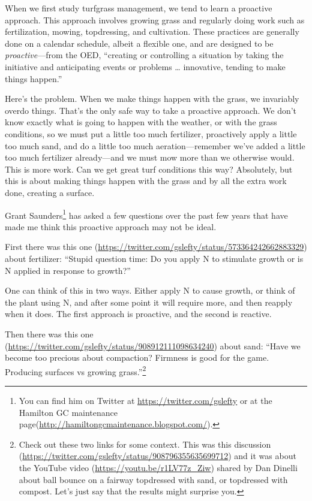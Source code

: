 \documentclass[12pt,b5,]{tufte-book}
\begin{document}
When we first study turfgrass management, we tend to learn a proactive approach. This approach involves growing grass and regularly doing work such as fertilization, mowing, topdressing, and cultivation. These practices are generally done on a calendar schedule, albeit a flexible one, and are designed to be \emph{proactive}---from the OED, ``creating or controlling a situation by taking the initiative and anticipating events or problems \ldots{} innovative, tending to make things happen.''

Here's the problem. When we make things happen with the grass, we invariably overdo things. That's the only safe way to take a proactive approach. We don't know exactly what is going to happen with the weather, or with the grass conditions, so we must put a little too much fertilizer, proactively apply a little too much sand, and do a little too much aeration---remember we've added a little too much fertilizer already---and we must mow more than we otherwise would. This is more work. Can we get great turf conditions this way? Absolutely, but this is about making things happen with the grass and by all the extra work done, creating a surface.

Grant Saunders\footnote{You can find him on Twitter at \url{https://twitter.com/gslefty} or at the Hamilton GC maintenance page(\url{http://hamiltongcmaintenance.blogspot.com/}).} has asked a few questions over the past few years that have made me think this proactive approach may not be ideal.

First there was this one (\url{https://twitter.com/gslefty/status/573364242662883329}) about fertilizer: ``Stupid question time: Do you apply N to stimulate growth or is N applied in response to growth?''

One can think of this in two ways. Either apply N to cause growth, or think of the plant using N, and after some point it will require more, and then reapply when it does. The first approach is proactive, and the second is reactive.

Then there was this one (\url{https://twitter.com/gslefty/status/908912111098634240}) about sand: ``Have we become too precious about compaction? Firmness is good for the game. Producing surfaces vs growing grass.''\footnote{Check out these two links for some context. This was this discussion (\url{https://twitter.com/gslefty/status/908796355635699712}) and it was about the YouTube video (\url{https://youtu.be/r1LV77z_Ziw}) shared by Dan Dinelli about ball bounce on a fairway topdressed with sand, or topdressed with compost. Let's just say that the results might surprise you.}
\end{document}
